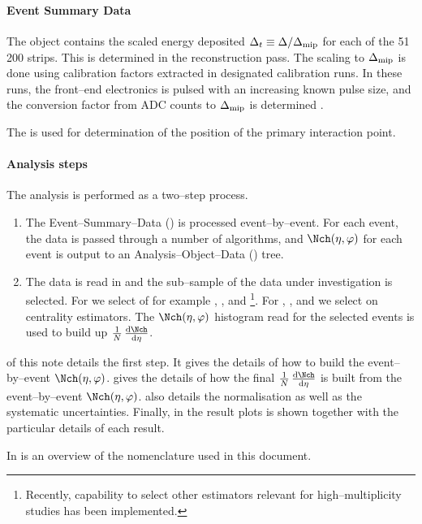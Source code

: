\paragraph{Event Summary Data} 
The \FMD{} \ESD{} object contains the scaled energy deposited
$\Delta_t\equiv\Delta /\Delta_{\text{mip}}$ for each of the 51\,200 strips.  This
is determined in the reconstruction pass.  The scaling to $\Delta_{\text{mip}}$
is done using calibration factors extracted in designated calibration
runs.  In these runs, the front--end electronics is pulsed with an
increasing known pulse size, and the conversion factor from ADC counts
to $\Delta_{\text{mip}}$ is determined \cite{cholm:2009}.

The \SPD{} is used for determination of the position of the primary
interaction point.

\paragraph{Analysis steps} 
The analysis is performed as a two--step process.  
\begin{enumerate}
\item The Event--Summary--Data (\ESD{}) is processed event--by--event.
  For each event, the data is passed through a number of algorithms,
  and $\dndetadphi$ for each event is output to an
  Analysis--Object--Data (\AOD{}) tree.
\item The \AOD{} data is read in and the sub--sample of the data under
  investigation is selected. For \ppCol{} we select of for example
  \INEL{}, \INELONE{}, and \NSD{}\footnote{Recently, capability to
    select other estimators relevant for high--multiplicity studies
    has been implemented.}. For \PbPbCol{}, \pPbCol{}, and \PbpCol{}
  we select on centrality estimators.  The $\dndetadphi$ histogram
  read for the selected events is used to build up $\ndndeta$.
\end{enumerate}

 of this note details the first step.  It gives
the details of how to build the event--by--event $\dndetadphi$.
 gives the details of how the final $\ndndeta$ is
built from the event--by--event $\dndetadphi$.  
also details the normalisation as well as the systematic
uncertainties.  Finally, in  the result plots is
shown together with the particular details of each result. 

In  is an overview of the nomenclature used in
this document.
